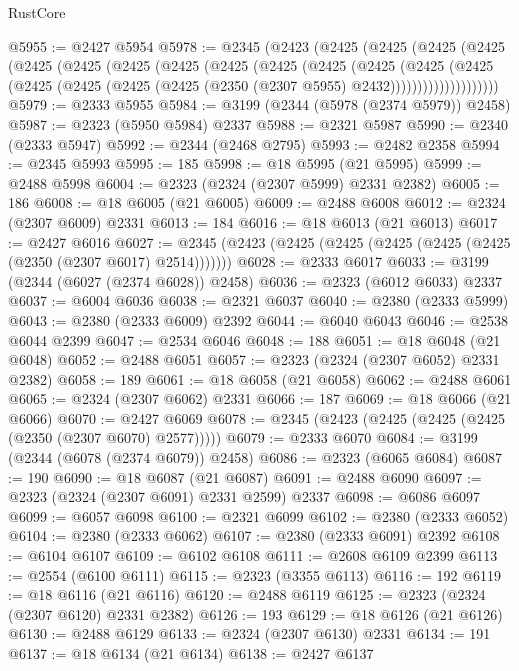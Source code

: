 \begin{lexlean}{RustCore}
\begin{coremodule}
@5955 := @2427 @5954
@5978 := @2345
    (@2423
      (@2425
        (@2425
          (@2425
            (@2425
              (@2425
                (@2425
                  (@2425
                    (@2425
                      (@2425
                        (@2425
                          (@2425
                            (@2425
                              (@2425
                                (@2425
                                  (@2425
                                    (@2425
                                      (@2425 (@2425 (@2350 (@2307 @5955) @2432))))))))))))))))))))
@5979 := @2333 @5955
@5984 := @3199 (@2344 (@5978 (@2374 @5979)) @2458)
@5987 := @2323 (@5950 @5984) @2337
@5988 := @2321 @5987
@5990 := @2340 (@2333 @5947)
@5992 := @2344 (@2468 @2795)
@5993 := @2482 @2358
@5994 := @2345 @5993
@5995 := 185
@5998 := @18 @5995 (@21 @5995)
@5999 := @2488 @5998
@6004 := @2323 (@2324 (@2307 @5999) @2331 @2382)
@6005 := 186
@6008 := @18 @6005 (@21 @6005)
@6009 := @2488 @6008
@6012 := @2324 (@2307 @6009) @2331
@6013 := 184
@6016 := @18 @6013 (@21 @6013)
@6017 := @2427 @6016
@6027 := @2345 (@2423 (@2425 (@2425 (@2425 (@2425 (@2425 (@2350 (@2307 @6017) @2514)))))))
@6028 := @2333 @6017
@6033 := @3199 (@2344 (@6027 (@2374 @6028)) @2458)
@6036 := @2323 (@6012 @6033) @2337
@6037 := @6004 @6036
@6038 := @2321 @6037
@6040 := @2380 (@2333 @5999)
@6043 := @2380 (@2333 @6009) @2392
@6044 := @6040 @6043
@6046 := @2538 @6044 @2399
@6047 := @2534 @6046
@6048 := 188
@6051 := @18 @6048 (@21 @6048)
@6052 := @2488 @6051
@6057 := @2323 (@2324 (@2307 @6052) @2331 @2382)
@6058 := 189
@6061 := @18 @6058 (@21 @6058)
@6062 := @2488 @6061
@6065 := @2324 (@2307 @6062) @2331
@6066 := 187
@6069 := @18 @6066 (@21 @6066)
@6070 := @2427 @6069
@6078 := @2345 (@2423 (@2425 (@2425 (@2425 (@2350 (@2307 @6070) @2577)))))
@6079 := @2333 @6070
@6084 := @3199 (@2344 (@6078 (@2374 @6079)) @2458)
@6086 := @2323 (@6065 @6084)
@6087 := 190
@6090 := @18 @6087 (@21 @6087)
@6091 := @2488 @6090
@6097 := @2323 (@2324 (@2307 @6091) @2331 @2599) @2337
@6098 := @6086 @6097
@6099 := @6057 @6098
@6100 := @2321 @6099
@6102 := @2380 (@2333 @6052)
@6104 := @2380 (@2333 @6062)
@6107 := @2380 (@2333 @6091) @2392
@6108 := @6104 @6107
@6109 := @6102 @6108
@6111 := @2608 @6109 @2399
@6113 := @2554 (@6100 @6111)
@6115 := @2323 (@3355 @6113)
@6116 := 192
@6119 := @18 @6116 (@21 @6116)
@6120 := @2488 @6119
@6125 := @2323 (@2324 (@2307 @6120) @2331 @2382)
@6126 := 193
@6129 := @18 @6126 (@21 @6126)
@6130 := @2488 @6129
@6133 := @2324 (@2307 @6130) @2331
@6134 := 191
@6137 := @18 @6134 (@21 @6134)
@6138 := @2427 @6137

\end{coremodule}
\end{lexlean}
